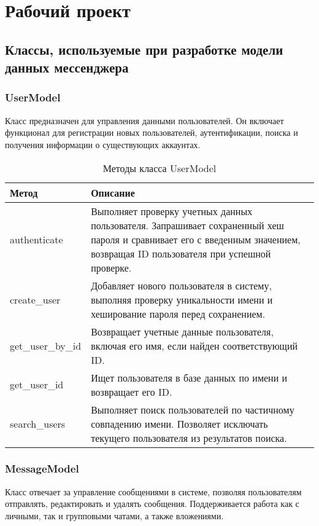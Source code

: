 \section{Рабочий проект}
\subsection{Классы, используемые при разработке модели данных мессенджера}

\subsubsection{UserModel} 

Класс предназначен для управления данными пользователей. Он включает функционал для регистрации новых пользователей, аутентификации, поиска и получения информации о существующих аккаунтах.

\begin{xltabular}{\textwidth}{|l|X|}
	\caption{Методы класса UserModel}\\ \hline
	\centrow Метод & \centrow Описание \\ \hline
	authenticate & Выполняет проверку учетных данных пользователя. Запрашивает сохраненный хеш пароля и сравнивает его с введенным значением, возвращая ID пользователя при успешной проверке. \\ \hline
	create\_user & Добавляет нового пользователя в систему, выполняя проверку уникальности имени и хеширование пароля перед сохранением. \\ \hline
	get\_user\_by\_id & Возвращает учетные данные пользователя, включая его имя, если найден соответствующий ID. \\ \hline
	get\_user\_id & Ищет пользователя в базе данных по имени и возвращает его ID. \\ \hline search\_users & Выполняет поиск пользователей по частичному совпадению имени. Позволяет исключать текущего пользователя из результатов поиска. \\ \hline
\end{xltabular}

\subsubsection{MessageModel} 

Класс отвечает за управление сообщениями в системе, позволяя пользователям отправлять, редактировать и удалять сообщения. Поддерживается работа как с личными, так и групповыми чатами, а также вложениями.

